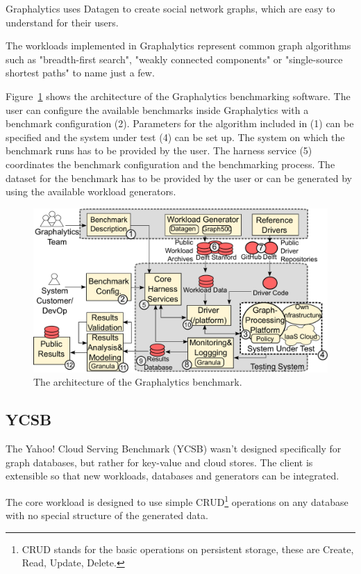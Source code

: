 Graphalytics uses Datagen to create social network graphs,
which are easy to understand for their users.~\cite[3]{Capota2015}

The workloads implemented in Graphalytics represent common graph algorithms such as "breadth-first search",
"weakly connected components" or "single-source shortest paths" to name just a few.~\cite[7]{Iosup}

Figure~\ref{fig:graphalyticsArchitecture} shows the architecture of the Graphalytics benchmarking software.
The user can configure the available benchmarks inside Graphalytics with a benchmark configuration (2).
Parameters for the algorithm included in (1) can be specified and the system under test (4) can be set up.
The system on which the benchmark runs has to be provided by the user.
The harness service (5) coordinates the benchmark configuration and the benchmarking process.
The dataset for the benchmark has to be provided by the user or can be generated by using the available workload generators.~\cite[11]{Iosup}

\begin{figure}[h!]
  \centering
  \includegraphics[width=.75\textwidth]{images/benchmarks/GraphalyticsArchitecture}
  \caption{The architecture of the Graphalytics benchmark.~\cite[11]{Iosup}}
  \label{fig:graphalyticsArchitecture}
\end{figure}

\subsection{YCSB}
\label{ch:background:se:ycsb}
The Yahoo! Cloud Serving Benchmark (YCSB) wasn't designed specifically for graph databases,
but rather for key-value and cloud stores.
The client is extensible so that new workloads,
databases and generators can be integrated.~\cite{Yahoo!2010}

The core workload is designed to use simple CRUD\footnote{CRUD stands for the basic operations on persistent storage, these are Create, Read, Update, Delete.} operations on any database with no special structure of the generated data.

